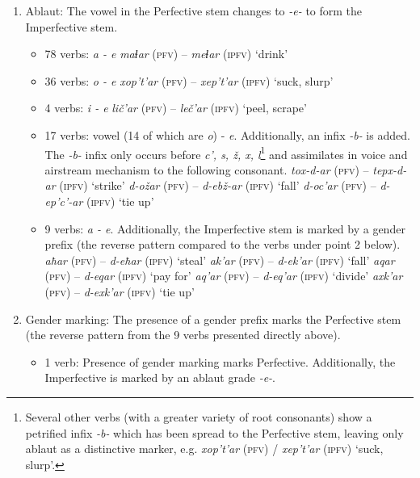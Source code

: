 \begin{enumerate}
	\item Ablaut: The vowel in the Perfective stem changes to \textit{-e-} to form the Imperfective stem.
	\begin{itemize}
		\item 78 verbs: \textit{a - e}
		\subitem \textit{maɬar} (\textsc{pfv}) – \textit{meɬar} (\textsc{ipfv}) `drink’
		\item 36 verbs: \textit{o - e}
		\subitem \textit{xop't'ar} (\textsc{pfv}) – \textit{xep't'ar} (\textsc{ipfv}) `suck, slurp’
		\item 4 verbs: \textit{i - e}
		\subitem \textit{lič'ar} (\textsc{pfv}) – \textit{leč'ar} (\textsc{ipfv}) `peel, scrape'
		\item 17 verbs: vowel (14 of which are \textit{o}) - \textit{e}. Additionally, an infix \textit{-b-} is added. The \textit{-b-} infix only occurs before \textit{c', s, ž, x, l}\footnote{Several other verbs (with a greater variety of root consonants) show a petrified infix \textit{-b-} which has been spread to the Perfective stem, leaving only ablaut as a distinctive marker, e.g. \textit{xop't'ar} (\textsc{pfv}) / \textit{xep't'ar} (\textsc{ipfv}) `suck, slurp'.} and assimilates in voice and airstream mechanism to the following consonant.
		\subitem \textit{tox-d-ar} (\textsc{pfv}) – \textit{tepx-d-ar} (\textsc{ipfv}) `strike’
		\subitem \textit{d-ožar} (\textsc{pfv}) – \textit{d-ebž-ar} (\textsc{ipfv}) `fall’
		\subitem \textit{d-oc'ar} (\textsc{pfv}) – \textit{d-ep'c'-ar} (\textsc{ipfv}) `tie up’
		\item 9 verbs: \textit{a - e}. Additionally, the Imperfective stem is marked by a gender prefix (the reverse pattern compared to the verbs under point 2 below).
		\subitem \textit{aħar} (\textsc{pfv}) – \textit{d-eħar} (\textsc{ipfv}) `steal’
		\subitem \textit{ak'ar} (\textsc{pfv}) – \textit{d-ek'ar} (\textsc{ipfv}) `fall’
		\subitem \textit{aqar} (\textsc{pfv}) – \textit{d-eqar} (\textsc{ipfv}) `pay for’
		\subitem \textit{aq'ar} (\textsc{pfv}) – \textit{d-eq'ar} (\textsc{ipfv}) `divide’
		\subitem \textit{axk'ar} (\textsc{pfv}) – \textit{d-exk'ar} (\textsc{ipfv}) `tie up’
	\end{itemize}
	\item Gender marking: The presence of a gender prefix marks the Perfective stem (the reverse pattern from the 9 verbs presented directly above).
	\begin{itemize}
		\item 1 verb: Presence of gender marking marks Perfective. Additionally, the Imperfective is marked by an ablaut grade \textit{-e-}.

\end{itemize}
\end{enumerate}
